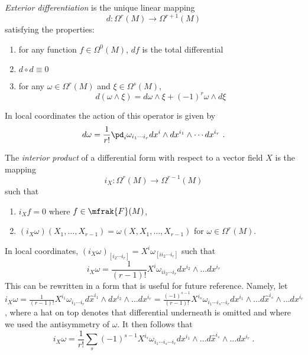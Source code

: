\documentclass[10pt,reqno]{amsart}
\numberwithin{equation}{section}
\begin{document}
\begin{definition}
	\emph{Exterior differentiation} is the unique linear mapping
	\begin{displaymath}
		d : \Omega^{r}(M) \to \Omega^{r+1}(M)
	\end{displaymath}
	satisfying the properties:
	\begin{enumerate}
		\item for any function $f \in \Omega^0(M)$, $df$ is the 
			total differential
		\item $d \circ d \equiv 0$
		\item for any $\omega \in \Omega^r(M)$ and $\xi \in 
			\Omega^s(M)$,
			\begin{displaymath}
				d(\omega \wedge \xi) = d\omega \wedge \xi + (-1)^r 
				\omega \wedge d\xi
			\end{displaymath}
	\end{enumerate}
\end{definition}
In local coordinates the action of this operator is given by 
\begin{displaymath}
	d\omega = \frac{1}{r!} \pd_i \omega_{i_1\cdots i_r} dx^i 
	\wedge dx^{i_1} \wedge \cdots dx^{i_r}~.
\end{displaymath}

\begin{definition}
	The \emph{interior product} of a differential form with 
	respect to a vector field $X$ is the mapping
	\begin{equation}
		i_X : \Omega^r(M) \to \Omega^{r-1}(M)
	\end{equation}
	such that
	\begin{enumerate}
		\item $i_X f = 0$ where $f \in \mfrak{F}(M)$,
		\item $(i_X \omega)(X_1,\ldots,X_{r-1}) = 
			\omega(X,X_1,\ldots,X_{r-1})$ for $\omega \in 
			\Omega^r(M)$.
	\end{enumerate}
\end{definition}

In local coordinates, $(i_X\omega)_{[i_2\cdots i_r]} = 
X^i\omega_{[ii_2\cdots i_r]}$ such that
\begin{equation}
	i_X\omega = \frac{1}{(r-1)!} X^i\omega_{ii_2\cdots i_r} 
	dx^{i_2} \wedge \ldots dx^{i_r}
\end{equation}
%
This can be rewritten in a form that is useful for future 
reference. Namely, let $i_X\omega = \tfrac{1}{(r-1)!}  
X^{i_1}\omega_{i_1\cdots i_r} d\hat{x}^{i_1}\wedge 
dx^{i_2}\wedge\ldots dx^{i_r} = \tfrac{(-1)^{s-1}}{(r-1)!}  
X^{i_s}\omega_{i_1\cdots i_s\cdots i_r} dx^{i_1}\wedge \ldots 
d\hat{x}^{i_s} \wedge \ldots dx^{i_r}$, where a hat on top 
denotes that differential underneath is omitted and where we used 
the antisymmetry of $\omega$. It then follows that
%
\begin{equation}
	i_X\omega = \frac{1}{r!}\sum_s (-1)^{s-1} X^{i_s} 
	\omega_{i_1\cdots i_s \cdots i_r} dx^{i_1} \wedge \ldots 
	d\hat{x}^{i_s} \wedge \ldots dx^{i_r}~.
\end{equation}
\end{document}
